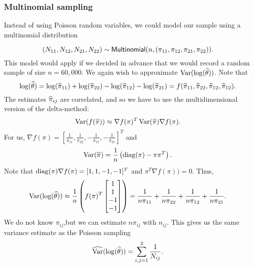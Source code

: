 \subsubsection{Multinomial sampling}
Instead of using Poisson random variables, we could model our sample using a multinomial distribution 

\[(N_{11},N_{12}, N_{21}, N_{22}) \sim \mathsf{Multinomial}(n,(\pi_{11},\pi_{12},\pi_{21}, \pi_{22})).\] 
This model would apply if we decided in advance that we would record a random sample of size $n=60,000$. We again wish to approximate $\operatorname{Var}(\log(\widehat{{\theta}}))$. Note that \[\log(\widehat{{\theta}}) = \log(\widehat{\pi}_{11})+\log(\widehat{\pi}_{22}) - \log(\widehat{\pi}_{12})-\log(\widehat{\pi}_{21}) = f(\widehat{\pi}_{11},\widehat{\pi}_{22},\widehat{\pi}_{12},\widehat{\pi}_{12}).\] The estimates $\widehat{\pi}_{ij}$ are correlated, and so we have to use the multidimensional version of the delta-method:
\[\operatorname{Var}(f(\widehat{\pi})) \approx \nabla f(\pi)^T \operatorname{Var}(\widehat{\pi}) \nabla f(\pi). \]
For us, $\nabla f(\pi) = \left[\frac{1}{\pi_{11}}, \frac{1}{\pi_{22}}, -\frac{1}{\pi_{12}}, -\frac{1}{\pi_{21}}\right]^T$ and 
\[\operatorname{Var}(\widehat{\pi}) = \frac{1}{n}\left(\operatorname{diag}(\pi)-\pi\pi^T\right). \]
Note that $\operatorname{diag}(\pi)\nabla f(\pi) = [1,1,-1,-1]^T$ and $\pi^T \nabla f(\pi))=0$. Thus,
\[\operatorname{Var}(\log(\widehat{{\theta}})) \approx \frac{1}{n}\left(f(\pi)^T \begin{bmatrix}
    1\\1\\-1\\-1
\end{bmatrix}\right)= \frac{1}{n\pi_{11}}+\frac{1}{n\pi_{22}}+\frac{1}{n\pi_{12}}+\frac{1}{n\pi_{21}}. \]
We do not know $\pi_{ij}$,but we can estimate $n\pi_{ij}$ with $n_{ij}$. This gives us the same variance estimate as the Poisson sampling
\[\widehat{\operatorname{Var}}(\log(\widehat{{\theta}})) = \sum_{i,j=1}^2 \frac{1}{N_{ij}}. \]
